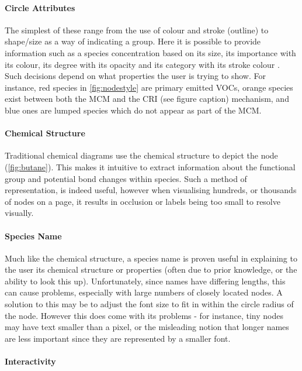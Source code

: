 \paragraph*{\color{c4}Circle Attributes}

The simplest of these range from the use of colour and stroke (outline) to shape/size as a way of indicating a group. Here it is possible to provide information such as a species concentration based on its size, its importance with its colour, its degree with its opacity and its category with its stroke colour \citep{colour,brightness}. Such decisions depend on what properties the user is trying to show. For instance, red species in \autoref{fig:nodestyle} are primary emitted VOCs, orange species exist between both the MCM and the CRI (see figure caption) mechanism, and blue ones are lumped species which do not appear as part of the MCM.


\paragraph*{\color{c1}Chemical Structure}
Traditional chemical diagrams use the chemical structure to depict the node (\autoref{fig:butane}). This makes it intuitive to extract information about the functional group and potential bond changes within species. Such a method of representation, is indeed useful, however when visualising hundreds, or thousands of nodes on a page, it results in occlusion or labels being too small to resolve visually.

\paragraph*{\color{c2}Species Name}

Much like the chemical structure, a species name is proven useful in explaining to the user its chemical structure or properties (often due to prior knowledge, or the ability to look this up). Unfortunately, since names have differing lengths, this can cause problems, especially with large numbers of closely located nodes. A solution to this may be to adjust the font size to fit in within the circle radius of the node. However this does come with its problems - for instance, tiny nodes may have text smaller than a pixel, or the misleading notion that longer names are less important since they are represented by a smaller font.


\paragraph*{\color{c3}Interactivity}

